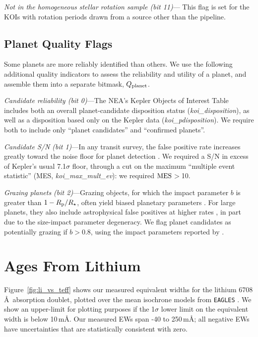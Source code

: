 \documentclass[11pt,twocolumn,tighten]{aastex63}
\begin{document}
{\it Not in the homogeneous stellar rotation sample (bit 11)}--- This
flag is set for the KOIs with rotation periods drawn from a source
other than the \citeauthor{Santos_2019} pipeline.




\subsection{Planet Quality Flags}
\label{subsec:plflags}
Some planets are more reliably identified than others.  We use the
following additional quality indicators to assess the reliability and
utility of a planet, and assemble them into a separate bitmask,
$Q_{\rm planet}$.

{\it Candidate reliability (bit 0)}---The NEA's Kepler Objects of
Interest Table includes both an overall planet-candidate disposition
status ({\it koi\_disposition}), as well as a disposition based only
on the Kepler data ({\it koi\_pdisposition}).  We require both to
include only ``planet candidates'' and ``confirmed planets''. 

{\it Candidate S/N (bit 1)}---In any transit survey, the false
positive rate increases greatly toward the noise floor for planet
detection \citep[e.g.][]{2002ApJ...564..495J}.  We required a S/N in
excess of Kepler's usual 7.1$\sigma$ floor, through a cut on the
maximum ``multiple event statistic'' (MES, {\it koi\_max\_mult\_ev}):
we required ${\rm MES}$$>$10.

{\it Grazing planets (bit 2)}---Grazing objects, for which the impact
parameter $b$ is greater than $1-R_{\rm p}/R_\star$, often yield
biased planetary parameters \citep[e.g.][]{2022AJ....163..111G}.  For
large planets, they also include astrophysical false positives at
higher rates \citep{2016ApJ...822...86M}, in part due to the
size-impact parameter degeneracy.  We flag planet candidates as
potentially grazing if $b$$>$0.8, using the impact parameters reported
by \citet{Thompson_2018}.




\section{Ages From Lithium}
\label{sec:liage} 

Figure~\ref{fig:li_vs_teff} shows our measured equivalent widths for
the lithium 6708\,\AA\ absorption doublet, plotted over the mean
isochrone models from \texttt{EAGLES} \citep{Jeffries_2023}.  We
show an upper-limit for plotting purposes if the 1$\sigma$ lower
limit on the equivalent width is below 10\,m\AA.  Our measured EWs
span -40 to 250\,m\AA; all negative EWs have uncertainties that are
statistically consistent with zero.
\end{document}
